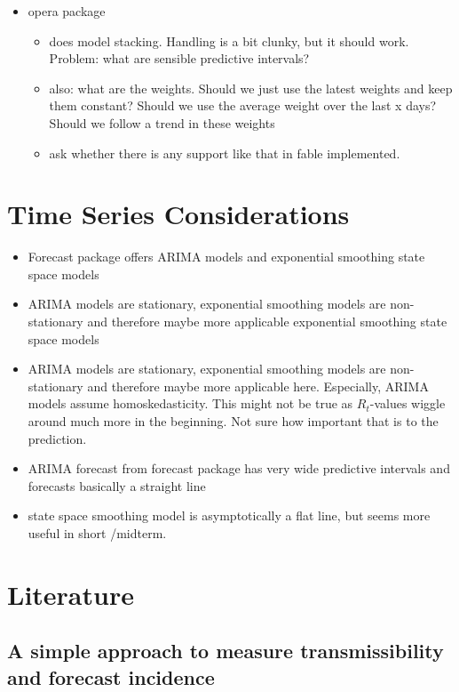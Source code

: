\begin{itemize}
\item opera package
	\begin{itemize}
	\item does model stacking. Handling is a bit clunky, but it should work. Problem: what are sensible predictive intervals? 
	\item also: what are the weights. Should we just use the latest weights and keep them constant? Should we use the average weight over the last x days? Should we follow a trend in these weights
	\item ask whether there is any support like that in fable implemented. 
	\end{itemize}
\end{itemize}



\chapter{Time Series Considerations}
\begin{itemize}
\item Forecast package offers ARIMA models and exponential smoothing state space models
\item ARIMA models are stationary, exponential smoothing models are non-stationary and therefore maybe more applicable exponential smoothing state space models
\item ARIMA models are stationary, exponential smoothing models are non-stationary and therefore maybe more applicable here. Especially, ARIMA models assume homoskedasticity. This might not be true as $R_t$-values wiggle around much more in the beginning. Not sure how important that is to the prediction. 
\item ARIMA forecast from forecast package has very wide predictive intervals and forecasts basically a straight line 
\item state space smoothing model is asymptotically a flat line, but seems more useful in short /midterm. 
\end{itemize}


\chapter{Literature}


\section{A simple approach to measure transmissibility and forecast incidence}

